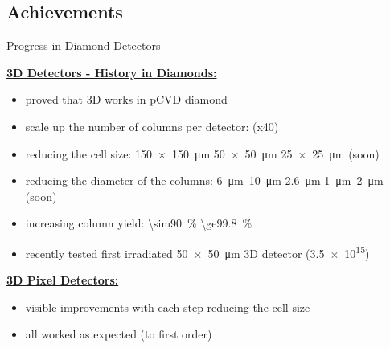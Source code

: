 \subsection{Achievements}
\begin{frame}{Progress in Diamond Detectors}

	\textbf{\underline{3D Detectors - History in Diamonds:}}\vspace*{5pt}
	\begin{itemize}\itemfill
		\item proved that 3D works in pCVD diamond
		\item scale up the number of columns per detector:  \ra {} (x40)
		\item reducing the cell size: \SI{150x150}{\micro\meter} \ra \SI{50x50}{\micro\meter} \ra \SI{25x25}{\micro\meter} (soon)
		\item reducing the diameter of the columns: \SIrange{6}{10}{\micro\meter} \ra \SI{2.6}{\micro\meter} \ra \SIrange{1}{2}{\micro\meter} (soon)
		\item \ra increasing column yield: \SI{\sim90}{\%} \ra \SI{\ge99.8}{\%}
		\item recently tested first irradiated \SI{50x50}{\micro\meter} 3D detector (\SI{3.5e15}{\ncm})
	\end{itemize}
	
	\vspace*{5pt}\textbf{\underline{3D Pixel Detectors:}}\vspace*{5pt}
	\begin{itemize}\itemfill
		\item visible improvements with each step reducing the cell size
		\item all worked as expected (to first order)
	\end{itemize}


\end{frame}
